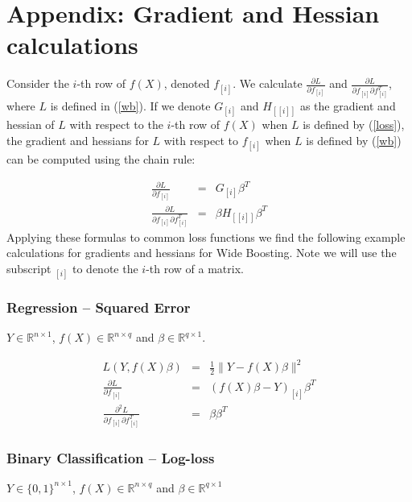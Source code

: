 \documentclass{article}
\begin{document}
\small





\section{Appendix: Gradient and Hessian calculations}
\label{gradhes}

Consider the $i$-th row of $f(X)$, denoted $f_{[i]}$. We calculate $\frac{\partial L}{\partial f_{[i]}}$ and $\frac{\partial L}{\partial f_{[i]} \partial f_{[i]}^T}$, where $L$ is defined in (\ref{wb}). If we denote $G_{[i]}$ and $H_{[[i]]}$ as the gradient and hessian of $L$ with respect to the $i$-th row of $f(X)$ when $L$ is defined by (\ref{loss}), the gradient and hessians for $L$ with respect to $f_{[i]}$ when $L$ is defined by (\ref{wb}) can be computed using the chain rule:

\begin{eqnarray}
\frac{\partial L}{\partial f_{[i]}} &=& G_{[i]} \beta^T \nonumber \\
\frac{\partial L}{\partial f_{[i]} \partial f_{[i]}^T} &=& \beta H_{[[i]]} \beta^T \nonumber
\end{eqnarray}
Applying these formulas to common loss functions we find the following example  calculations for gradients and hessians for Wide Boosting. Note we will use the subscript $_{[i]}$ to denote the $i$-th row of a matrix. 

\subsubsection{Regression -- Squared Error}
$Y \in \mathbb{R}^{n \times 1}$, $f(X) \in \mathbb{R}^{n \times q}$ and $\beta \in \mathbb{R}^{q \times 1}$. 

\begin{eqnarray}
L(Y,f(X)\beta) & = & \frac{1}{2} \| Y - f(X)\beta \|^2  \nonumber \\
\frac{\partial L}{\partial f_{[i]} } & = & (f(X)\beta - Y)_{[i]} \beta^T \nonumber \\
\frac{\partial^2 L}{\partial f_{[i]} \partial f_{[i]}^T} &=& \beta \beta^T \nonumber
\end{eqnarray}

\subsubsection{Binary Classification -- Log-loss}
$Y \in \{0,1\}^{n \times 1}$, $f(X) \in \mathbb{R}^{n \times q}$ and $\beta \in \mathbb{R}^{q \times 1}$
\end{document}
